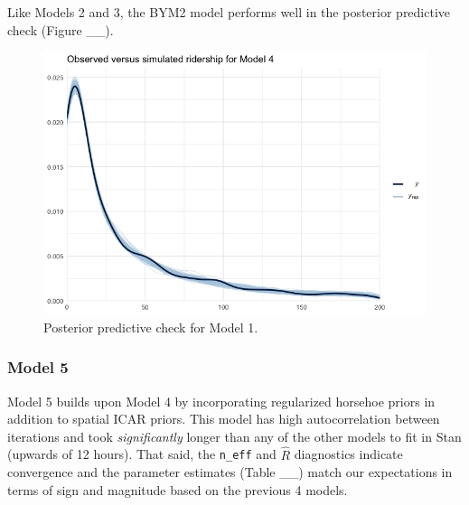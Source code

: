 \documentclass[
]{article}
\begin{document}
Like Models 2 and 3, the BYM2 model performs well in the posterior
predictive check (Figure \_\_).

\begin{figure}[H]
  \centering
  \includegraphics[width = 6in]{ppcheckmod4.png}
  \caption{Posterior predictive check for Model 1.}
\end{figure}

\hypertarget{model-5}{%
\subsubsection{Model 5}\label{model-5}}

Model 5 builds upon Model 4 by incorporating regularized horsehoe priors
in addition to spatial ICAR priors. This model has high autocorrelation
between iterations and took \emph{significantly} longer than any of the
other models to fit in Stan (upwards of 12 hours). That said, the
\texttt{n\_eff} and \(\hat{R}\) diagnostics indicate convergence and the
parameter estimates (Table \_\_) match our expectations in terms of sign
and magnitude based on the previous 4 models.
\end{document}
